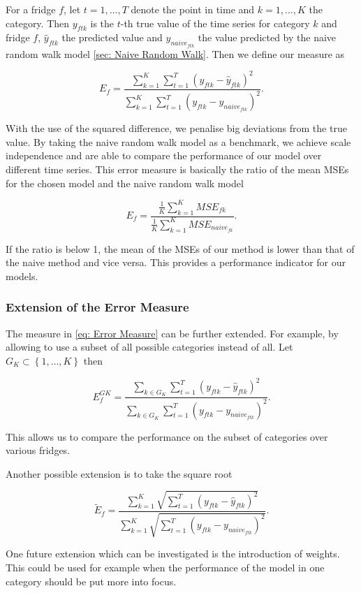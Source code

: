 For a fridge $f$, let $t = 1,\ldots,T$ denote the point in time and $k=1,\ldots,K$ the category. Then $y_{ftk}$ is the $t$-th true value of the time series for category $k$ and fridge $f$, $\hat{y}_{ftk}$ the predicted value and $y_{naive_{ftk}}$ the value predicted by the naive random walk model \ref{sec: Naive Random Walk}. Then we define our measure as

\begin{equation}
E_f=\frac{\sum_{k=1}^{K}\sum_{t=1}^T(y_{ftk}-\hat{y}_{ftk})^2}{\sum_{k=1}^{K}\sum_{t=1}^T(y_{ftk}-y_{naive_{ftk}})^2}.
\label{eq: Error Measure}
\end{equation}

With the use of the squared difference, we penalise big deviations from the true value. By taking the naive random walk model as a benchmark, we achieve scale independence and are able to compare the performance of our model over different time series. This error measure is basically the ratio of the mean MSEs for the chosen model and the naive random walk model

\begin{equation}
E_f=\frac{\frac{1}{K}\sum_{k=1}^K MSE_{fk}}{\frac{1}{K}\sum_{k=1}^K MSE_{naive_{fk}}}.
\label{eq: Error Measure MSE}
\end{equation}

If the ratio is below 1, the mean of the MSEs of our method is lower than that of the naive method and vice versa. This provides a performance indicator for our models. 

\subsubsection{Extension of the Error Measure}
\label{sec:Error Measure Extension}

The measure in \ref{eq: Error Measure} can be further extended. For example, by allowing to use a subset of all possible categories instead of all. Let $G_K \subset \left\{1,\ldots,K\right\}$ then

\begin{equation}
E^{GK}_{f}=\frac{\sum_{k \in G_K}\sum_{t=1}^T(y_{ftk}-\hat{y}_{ftk})^2}{\sum_{k \in G_K}\sum_{t=1}^T(y_{ftk}-y_{naive_{ftk}})^2}.
\label{eq: Error Measure Subsets}
\end{equation}

This allows us to compare the performance on the subset of categories over various fridges. 

Another possible extension is to take the square root

\begin{equation}
\widetilde{E}_f=\frac{\sum_{k=1}^{K}\sqrt{\sum_{t=1}^T(y_{ftk}-\hat{y}_{ftk})^2}}{\sum_{k=1}^{K}\sqrt{\sum_{t=1}^T(y_{ftk}-y_{naive_{ftk}})^2}}.
\label{eq: Error Measure Sqrt} 
\end{equation}

One future extension which can be investigated is the introduction of weights. This could be used for example when the performance of the model in one category should be put more into focus. 